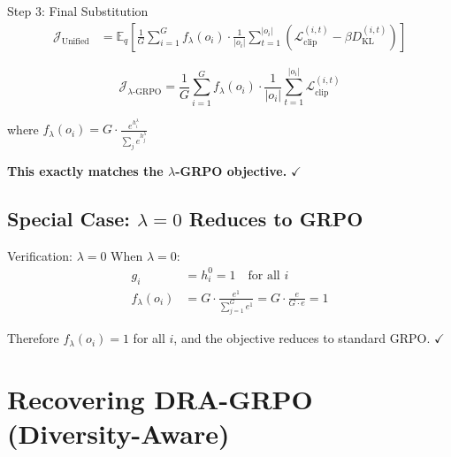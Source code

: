 \documentclass[11pt,a4paper]{article}
\begin{document}
\begin{proofbox}{Step 3: Final Substitution}
\begin{align}
\mathcal{J}_{\text{Unified}} &= \mathbb{E}_{q} \left[ \frac{1}{G} \sum_{i=1}^{G} f_\lambda(o_i) \cdot \frac{1}{|o_i|} \sum_{t=1}^{|o_i|} \left( \mathcal{L}_{\text{clip}}^{(i,t)} - \beta D_{\text{KL}}^{(i,t)} \right) \right]
\end{align}
\end{proofbox}

\begin{resultbox}
\begin{equation}
\mathcal{J}_{\lambda\text{-GRPO}} = \frac{1}{G} \sum_{i=1}^{G} f_\lambda(o_i) \cdot \frac{1}{|o_i|} \sum_{t=1}^{|o_i|} \mathcal{L}_{\text{clip}}^{(i,t)}
\end{equation}

where $f_\lambda(o_i) = G \cdot \frac{e^{h_i^\lambda}}{\sum_j e^{h_j^\lambda}}$

\textbf{This exactly matches the $\lambda$-GRPO objective.} $\checkmark$
\end{resultbox}

\subsection{Special Case: $\lambda = 0$ Reduces to GRPO}

\begin{proofbox}{Verification: $\lambda = 0$}
When $\lambda = 0$:
\begin{align}
g_i &= h_i^0 = 1 \quad \text{for all } i \\
f_\lambda(o_i) &= G \cdot \frac{e^1}{\sum_{j=1}^G e^1} = G \cdot \frac{e}{G \cdot e} = 1
\end{align}

Therefore $f_\lambda(o_i) = 1$ for all $i$, and the objective reduces to standard GRPO. $\checkmark$
\end{proofbox}

\newpage

\section{Recovering DRA-GRPO (Diversity-Aware)}
\end{document}
